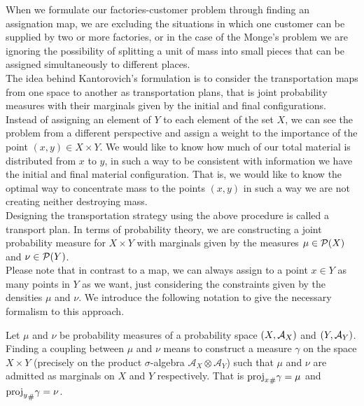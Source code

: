 When we formulate our factories-customer problem through finding an assignation map, we are excluding the situations in which one customer can be supplied by two or more factories, or in the case of the Monge's problem we are ignoring the possibility of splitting a unit of mass into small pieces that can be assigned simultaneously to different places. \\

The idea behind Kantorovich's formulation is to consider the transportation maps from one space to another as transportation plans, that is joint probability measures with their marginals given by the initial and final configurations.\\

Instead of assigning an element of $Y$ to each element of the set $X$, we can see the problem from a different perspective and assign a weight to the importance of the point $\left(x, y\right)\in X\times Y$. We would like to know how much of our total material is distributed from $x$ to $y$, in such a way to be consistent with information we have the initial and final material configuration. That is, we would like to know the optimal way to concentrate mass to the points $(x, y)$ in such a way we are not creating neither destroying mass. \\

Designing the transportation strategy using the above procedure is called a transport plan. In terms of probability theory, we are constructing a joint probability measure for $X\times Y$ with marginals given by the measures $\mu \in \mathcal{P}(X)$ and $\nu \in \mathcal{P}(Y)$. \\

Please note that in contrast to a map, we can always assign to a point $x\in Y$ as many points in $Y$ as we want, just considering the constraints given by the densities $\mu$ and $\nu$. We introduce the following notation to give the necessary formalism to this approach. 

\begin{definition}[Coupling]
Let $\mu$ and $\nu$ be probability measures of a probability space $\left( X, \mathcal{A}_X \right)$ and $\left( Y, \mathcal{A}_Y \right)$. Finding a coupling between $\mu$ and $\nu$ means to construct a measure $\gamma$ on the space $X\times Y$ (precisely on the product $\sigma$-algebra $\mathcal{A}_X\otimes\mathcal{A}_Y$) such that $\mu$ and $\nu$ are admitted as marginals on $X$ and $Y$ respectively. That is ${\mathrm{proj}_x}_{\#} \gamma=\mu$ and ${\mathrm{proj}_y}_{\#} \gamma=\nu$. \label{def: Coupling}
\end{definition}
 

